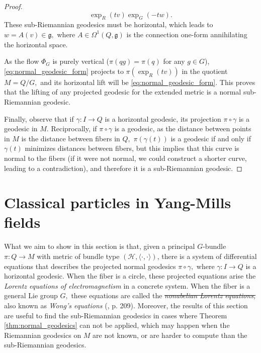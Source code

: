 \documentclass[12pt, letterpaper, reqno]{amsart}
\theoremstyle{definition}
\theoremstyle{plain}
\theoremstyle{remark}
\providecommand{\DIFadd}[1]{{\protect\color{blue}\uwave{#1}}} %
\providecommand{\DIFdel}[1]{{\protect\color{red}\sout{#1}}}                      %
\providecommand{\DIFaddbegin}{} %
\providecommand{\DIFaddend}{} %
\providecommand{\DIFdelbegin}{} %
\providecommand{\DIFdelend}{} %
\newcommand{\DIFscaledelfig}{0.5}
\newlength{\DIFdelgraphicswidth} %
\newlength{\DIFdelgraphicsheight} %
\newcommand{\DIFaddincludegraphics}[2][]{{\color{blue}\fbox{\DIFOincludegraphics[#1]{#2}}}} %
\newcommand{\DIFdelincludegraphics}[2][]{%
\sbox{\DIFdelgraphicsbox}{\DIFOincludegraphics[#1]{#2}}%
\settoboxwidth{\DIFdelgraphicswidth}{\DIFdelgraphicsbox} %
\settoboxtotalheight{\DIFdelgraphicsheight}{\DIFdelgraphicsbox} %
\scalebox{\DIFscaledelfig}{%
\parbox[b]{\DIFdelgraphicswidth}{\usebox{\DIFdelgraphicsbox}\\[-\baselineskip] \rule{\DIFdelgraphicswidth}{0em}}\llap{\resizebox{\DIFdelgraphicswidth}{\DIFdelgraphicsheight}{%
\setlength{\unitlength}{\DIFdelgraphicswidth}%
\begin{picture}(1,1)%
\thicklines\linethickness{2pt} %
{\color[rgb]{1,0,0}\put(0,0){\framebox(1,1){}}}%
{\color[rgb]{1,0,0}\put(0,0){\line( 1,1){1}}}%
{\color[rgb]{1,0,0}\put(0,1){\line(1,-1){1}}}%
\end{picture}%
}\hspace*{3pt}}} %
} %
\DeclareRobustCommand{\DIFaddbegin}{\DIFOaddbegin \let\includegraphics\DIFaddincludegraphics} %
\DeclareRobustCommand{\DIFaddend}{\DIFOaddend \let\includegraphics\DIFOincludegraphics} %
\DeclareRobustCommand{\DIFdelbegin}{\DIFOdelbegin \let\includegraphics\DIFdelincludegraphics} %
\DeclareRobustCommand{\DIFdelend}{\DIFOaddend \let\includegraphics\DIFOincludegraphics} %
\begin{document}
\begin{proof}
	\begin{equation}\label{eq:normal_geodesic_form}
		\operatorname{exp}_R(tv)  \operatorname{exp}_G(-tw).
	\end{equation}
	These sub-Riemannian geodesics must be horizontal, which leads to $ w=A(v)\in \mathfrak{g}, $ where $A\in \Omega^1(Q, \mathfrak{g})$ is the connection one-form annihilating the horizontal space.

	As the flow $ \Phi_G $ is purely vertical ($\pi(qg)=\pi(q)$ for any $ g\in G $), \eqref{eq:normal_geodesic_form} projects to $ \pi( \operatorname{exp}_R(tv)) $ in the quotient $ M=Q/G, $ and its horizontal lift will be \eqref{eq:normal_geodesic_form}. This proves that the lifting of any projected geodesic for the extended metric is a normal sub-Riemannian geodesic.

	Finally, observe that if $ \gamma: I \rightarrow Q $ is a horizontal geodesic, its projection $ \pi\circ\gamma $ is a geodesic in $ M. $ Reciprocally, if $ \pi\circ\gamma $ is a geodesic, as the distance between points in $ M $ is the distance between fibers in $ Q, $ $ \pi(\gamma(t) ) $ is a geodesic if and only if $\gamma(t)$ minimizes distances between fibers, but this implies that this curve is normal to the fibers (if it were not normal, we could construct a shorter curve, leading to a contradiction), and therefore it is a sub-Riemannian geodesic.  
\end{proof}

\section{Classical particles in Yang-Mills fields}%
\label{sec:classical_particles_in_yang_mills_fields}


What we aim to show in this section is that, given a principal $ G $-bundle $ \pi:Q \rightarrow M $ with metric of bundle type $ (\mathcal{H}, \langle\cdot, \cdot \rangle) $,   there is a system of differential equations that describes the projected normal geodesics $ \pi\circ\gamma, $ where $ \gamma: I \rightarrow Q $ is a horizontal geodesic. When the fiber is a circle, \DIFaddbegin \DIFadd{from }\DIFaddend these projected equations arise the \textit{Lorentz equations of electromagnetism} in a concrete system. When the fiber is a general Lie group $ G, $ these equations are called the \DIFdelbegin \textit{\DIFdel{nonabelian Lorentz equations,}} %
\DIFdelend \DIFaddbegin \textit{\DIFadd{non-abelian Lorentz equations,}} \DIFaddend also known as \textit{Wong's equations} (\cite{montgomery2002tour}, p. 209). Moreover, the results of this section are useful to find the sub-Riemannian geodesics in cases where Theorem \ref{thm:normal_geodesics} can not be applied, which may happen when the Riemannian geodesics on $ M $ are not known, or are harder to compute than the sub-Riemannian geodesics.
\end{document}
